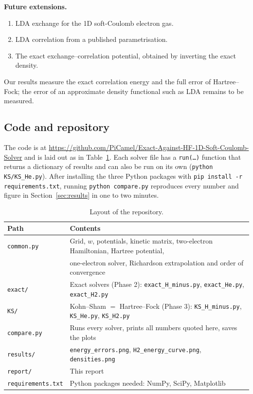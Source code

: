 \documentclass[11pt,a4paper]{article}
\begin{document}
\textbf{Future extensions.}
\begin{enumerate}[label=\textbf{Phase \arabic*.},leftmargin=*,start=4]
  \item LDA exchange for the 1D soft-Coulomb electron gas.
  \item LDA correlation from a published parametrisation.
  \item The exact exchange--correlation potential, obtained by inverting the exact density.
\end{enumerate}

Our results measure the exact correlation energy and the full error of
Hartree--Fock; the error of an approximate density functional such as LDA remains to be measured.

\subsection{Code and repository}

The code is at \url{https://github.com/PiCamel/Exact-Against-HF-1D-Soft-Coulomb-Solver} and is laid out
as in Table~\ref{tab:repo}. Each solver file has a \texttt{run(\dots)} function that returns a dictionary of
results and can also be run on its own (\texttt{python KS/KS\_He.py}). After installing the three Python packages
with \texttt{pip install -r requirements.txt}, running \texttt{python compare.py} reproduces every number and figure
in Section~\ref{sec:results} in one to two minutes.

\begin{table}[H]
\centering\small
\begin{tabular}{@{}ll@{}}
\toprule
Path & Contents\\
\midrule
\texttt{common.py}  & Grid, $w$, potentials, kinetic matrix, two-electron Hamiltonian, Hartree potential,\\
                    & one-electron solver, Richardson extrapolation and order of convergence\\
\texttt{exact/}     & Exact solvers (Phase 2): \texttt{exact\_H\_minus.py}, \texttt{exact\_He.py}, \texttt{exact\_H2.py}\\
\texttt{KS/}        & Kohn--Sham $=$ Hartree--Fock (Phase 3): \texttt{KS\_H\_minus.py}, \texttt{KS\_He.py}, \texttt{KS\_H2.py}\\
\texttt{compare.py} & Runs every solver, prints all numbers quoted here, saves the plots\\
\texttt{results/}   & \texttt{energy\_errors.png}, \texttt{H2\_energy\_curve.png}, \texttt{densities.png}\\
\texttt{report/}    & This report\\
\texttt{requirements.txt} & Python packages needed: NumPy, SciPy, Matplotlib\\
\bottomrule
\end{tabular}
\caption{Layout of the repository.}
\label{tab:repo}
\end{table}
\end{document}
